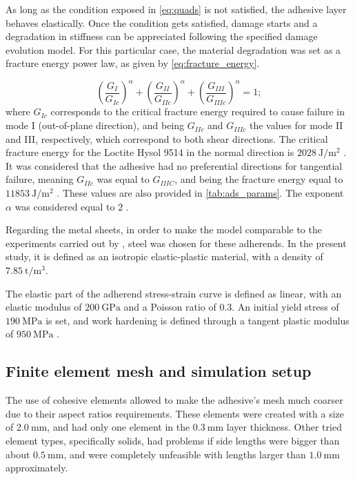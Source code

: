 \documentclass[cmfonts]{witpress}
\begin{document}
As long as the condition exposed in \cref{eq:quads} is not satisfied, the adhesive layer behaves elastically. Once the condition gets satisfied, damage starts and a degradation in stiffness can be appreciated following the specified damage evolution model. For this particular case, the material degradation was set as a fracture energy power law, as given by \cref{eq:fracture_energy}.

\begin{equation}
\left(\frac{G_{I}}{G_{Ic}}\right)^{\alpha}+\left(\frac{G_{II}}{G_{IIc}}\right)^{\alpha}+\left(\frac{G_{III}}{G_{IIIc}}\right)^{\alpha}=1 ;
\label{eq:fracture_energy}
\end{equation}
where $G_{Ic}$ corresponds to the critical fracture energy required to cause failure in mode I (out-of-plane direction), and being $G_{IIc}$ and $G_{IIIc}$ the values for mode II and III, respectively, which correspond to both shear directions. The critical fracture energy for the Loctite Hysol 9514 in the normal direction is $\SI{2028}{\J/\m^2}$ \cite{Scattina2011}. It was considered that the adhesive had no preferential directions for tangential failure, meaning $G_{IIc}$ was equal to $G_{IIIC}$, and being the fracture energy equal to $\SI{11853}{\J/\m^2}$ \cite{Scattina2011}. These values are also provided in \cref{tab:ads_params}. The exponent $\alpha$ was considered equal to $\num{2}$ \cite{Loureiro2010, Sadowski2010, SernaMoreno2015}.

Regarding the metal sheets, in order to make the model comparable to the experiments carried out by \cite{Peroni2009}, steel was chosen for these adherends. In the present study, it is defined as an isotropic elastic-plastic material, with a density of $\SI{7.85}{\tonne/\m^3}$.

The elastic part of the adherend stress-strain curve is defined as linear, with an elastic modulus of $\SI{200}{\GPa}$ and a Poisson ratio of $\num{0.3}$. An initial yield stress of $\SI{190}{\MPa}$ is set, and work hardening is defined through a tangent plastic modulus of $\SI{950}{\MPa}$ \cite{Peroni2009}.



\subsection{Finite element mesh and simulation setup}

The use of cohesive elements allowed to make the adhesive's mesh much coarser due to their aspect ratios requirements. These elements were created with a size of $\SI{2.0}{\mm}$, and had only one element in the $\SI{0.3}{\mm}$ layer thickness. Other tried element types, specifically solids, had problems if side lengths were bigger than about $\SI{0.5}{\mm}$, and were completely unfeasible with lengths larger than $\SI{1.0}{\mm}$ approximately.
\end{document}
